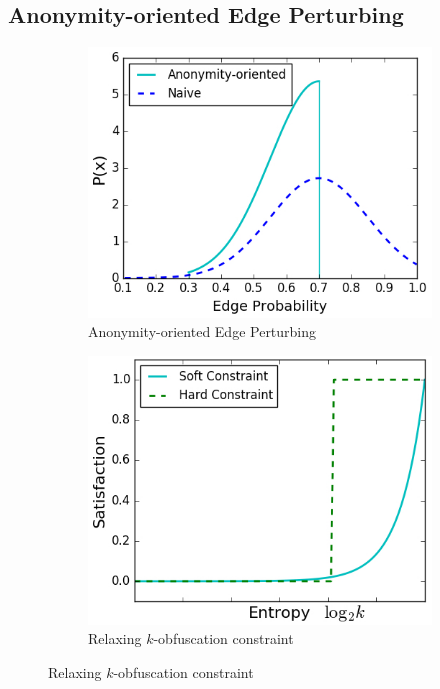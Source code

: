 \subsection{Anonymity-oriented Edge Perturbing}
\begin{figure}
    \captionsetup{justification=centering,margin=1cm}
       \begin{subfigure}[b]{0.45\textwidth}
        \centering
        \includegraphics[scale=0.35]{figures/DegreeAUG/AnonymityEP.eps}
        \caption{\small{Anonymity-oriented Edge Perturbing}}
        \label{fig:anonymityEP}
    \end{subfigure}%
    \centering
        \begin{subfigure}[b]{0.45\textwidth}
            \includegraphics[scale=0.35]{figures/DegreeAUG/constraint.eps}
            \caption{\small{Relaxing $k$-obfuscation constraint}}
            \label{fig:constraintRelax}
        \end{subfigure} 
\end{figure}
